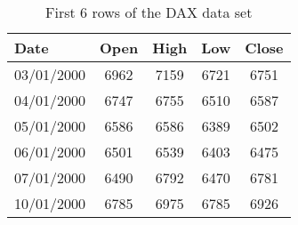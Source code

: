 \begin{table}[ht]
\centering
\caption[First 6 rows of the DAX data set.]{First 6 rows of the DAX data set} 
\label{tab:daxhead}
\begin{tabular}{lcccc}
  \toprule Date & Open & High & Low & Close \\ 
  \midrule 03/01/2000 & 6962 & 7159 & 6721 & 6751 \\ 
  04/01/2000 & 6747 & 6755 & 6510 & 6587 \\ 
  05/01/2000 & 6586 & 6586 & 6389 & 6502 \\ 
  06/01/2000 & 6501 & 6539 & 6403 & 6475 \\ 
  07/01/2000 & 6490 & 6792 & 6470 & 6781 \\ 
  10/01/2000 & 6785 & 6975 & 6785 & 6926 \\ 
   \bottomrule \end{tabular}
\end{table}
